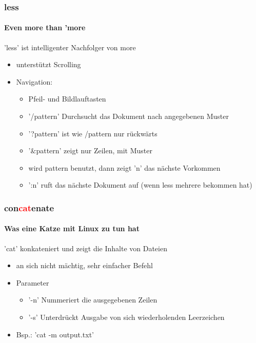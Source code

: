 \documentclass[12pt,utf8]{beamer}
\begin{document}
\begin{frame}
\frametitle{less}
\framesubtitle{Even more than 'more}
'less' ist intelligenter Nachfolger von more
\begin{itemize}
	\item unterstützt Scrolling
	\item Navigation:
	\begin{itemize}[<+->]
		\item Pfeil- und Bildlauftasten
		\item '/pattern' Durchsucht das Dokument nach angegebenen Muster
		\item '?pattern' ist wie /pattern nur rückwärts
		\item '$\&$pattern' zeigt nur Zeilen, mit Muster
		\item wird pattern benutzt, dann zeigt 'n' das nächste Vorkommen
		\item ':n' ruft das nächste Dokument auf (wenn less mehrere bekommen hat)
	\end{itemize}
\end{itemize}
\end{frame}

\begin{frame}
\frametitle{con\textcolor{red}{cat}enate}
\framesubtitle{Was eine Katze mit Linux zu tun hat}
'cat' konkateniert und zeigt die Inhalte von Dateien
\begin{itemize}[<+->]
	\item an sich nicht mächtig, sehr einfacher Befehl
	\item Parameter
	\begin{itemize}
		\item '-n' Nummeriert die ausgegebenen Zeilen 
		\item '-s' Unterdrückt Ausgabe von sich wiederholenden Leerzeichen
	\end{itemize}
	\item Bsp.: 'cat -m output.txt'
\end{itemize}
\end{frame}
\end{document}

